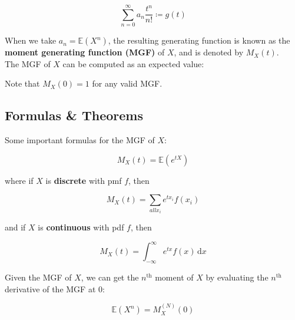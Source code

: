 \documentclass{article}
\begin{document}
\begin{equation*}
    \sum_{n=0}^{\infty} a_n \frac{t^{n}}{n!} \coloneqq g(t) 
\end{equation*}

\begin{definition}
    When we take $a_n = \mathbb{E}(X^{n})$, the resulting generating function is known as the \textbf{moment generating function (MGF)} of $X$, and is denoted by $M_X(t)$. \\ 

    \noindent The MGF of $X$ can be computed as an expected value: 

\end{definition}

\noindent Note that $M_X (0) = 1$ for any valid MGF. 

\subsection{Formulas \& Theorems}
Some important formulas for the MGF of $X$:

\begin{equation}
    \boxed{M_X (t) = \mathbb{E} (e^{tX})} 
\end{equation}

\noindent where if $X$ is \textbf{discrete} with pmf $f$, then 

\begin{equation}
    M_X (t) = \sum_{all x_i} e^{t x_i} f(x_i) 
\end{equation}

\noindent and if $X$ is \textbf{continuous} with pdf $f$, then 

\begin{equation}
    M_X (t) = \int_{-\infty}^{\infty} e^{tx} f(x) \, \mathrm{d}x
\end{equation}

\begin{theorem}
    Given the MGF of $X$, we can get the $n^{\text{th}}$ moment of $X$ by evaluating the $n^{\text{th}}$ derivative of the MGF at 0: 

    \begin{equation}
        \boxed{\mathbb{E}(X^{n}) = M_X^{(N)} (0)} 
    \end{equation}
\end{theorem}
\end{document}

